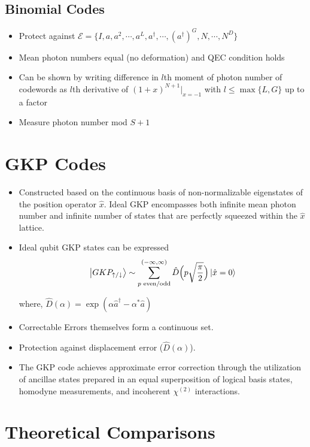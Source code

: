 \documentclass[english]{article}
\begin{document}
\subsection*{Binomial Codes}

\begin{itemize}
\item Protect against $\mathcal{E} = \{I, a, a^2, \cdots, a^L, a^\dag, \cdots, (a^\dag)^G, N, \cdots, N^D \}$
\item Mean photon numbers equal (no deformation) and QEC condition holds
\item Can be shown by writing difference in $l$th moment of photon number of codewords as $l$th derivative of $(1+x)^{N+1}\vert_{x=-1}$ with $l \leq \max\{L, G\}$ up to a factor
\item Measure photon number mod $S+1$
\end{itemize}

\section*{GKP Codes}

\begin{itemize}
\item Constructed based on the continuous basis of non-normalizable eigenstates of the position operator $\hat{x}$. Ideal GKP encompasses both infinite mean photon number and infinite number of states that are perfectly squeezed within the $\hat{x}$ lattice.
\item Ideal qubit GKP states can be expressed $$\ket{GKP_{\uparrow/\downarrow}} \sim \sum_{p\text{ even/odd}}^{(-\infty, \infty)} \hat{D}\Big(p \sqrt{\frac{\pi}{2}} \Big) \ket{\hat{x} = 0}$$ 	

where,  $\hat{D}(\alpha) = \exp(\alpha \hat{a}^\dag - \alpha^* \hat{a})$
\item Correctable Errors themselves form a continuous set. 
\item Protection against displacement error ($\hat{D}(\alpha)$).
\item The GKP code achieves approximate error correction through the utilization of ancillae states prepared in an equal superposition of logical basis states, homodyne measurements, and incoherent $\chi^{(2)}$ interactions.
\end{itemize}

\section*{Theoretical Comparisons}
\end{document}
